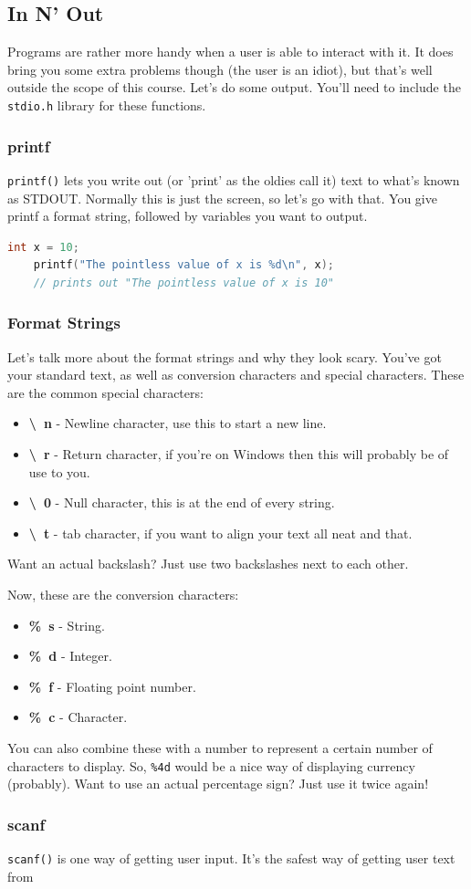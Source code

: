 \subsection{In N' Out}
Programs are rather more handy when a user is able to interact with it. It does bring you some extra problems though (the user is an idiot), but that's well outside the scope of this course. Let's do some output. You'll need to include the \texttt{stdio.h} library for these functions.

\subsubsection{printf}
\texttt{printf()} lets you write out (or 'print' as the oldies call it) text to what's known as STDOUT. Normally this is just the screen, so let's go with that. You give printf a format string, followed by variables you want to output.
\begin{lstlisting}[language=C]
    int x = 10;
    printf("The pointless value of x is %d\n", x);
    // prints out "The pointless value of x is 10"
\end{lstlisting}

\subsubsection{Format Strings}
Let's talk more about the format strings and why they look scary. You've got your standard text, as well as conversion characters and special characters. These are the common special characters:
\begin{itemize}
    \item \textbf{\textbackslash~n} - Newline character, use this to start a new line.
    \item \textbf{\textbackslash~r} - Return character, if you're on Windows then this will probably be of use to you.
    \item \textbf{\textbackslash~0} - Null character, this is at the end of every string.
    \item \textbf{\textbackslash~t} - tab character, if you want to align your text all neat and that.
\end{itemize}

Want an actual backslash? Just use two backslashes next to each other.

Now, these are the conversion characters:
\begin{itemize}
    \item \textbf{\%~s} - String.
    \item \textbf{\%~d} - Integer.
    \item \textbf{\%~f} - Floating point number.
    \item \textbf{\%~c} - Character.
\end{itemize}
You can also combine these with a number to represent a certain number of characters to display. So, \texttt{\%4d} would be a nice way of displaying currency (probably). Want to use an actual percentage sign? Just use it twice again!

\subsubsection{scanf}
\texttt{scanf()} is one way of getting user input. It's the safest way of getting user text from
